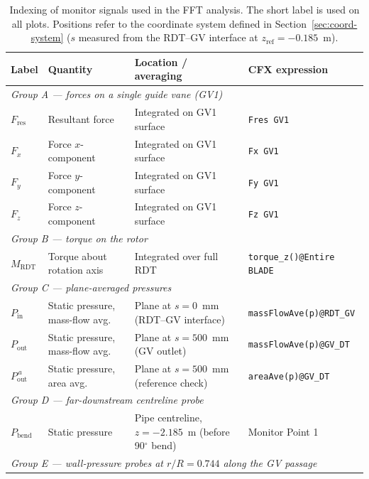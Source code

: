\begin{table}[H]
\centering
\small
\caption{Indexing of monitor signals used in the FFT analysis. The
short label is used on all plots. Positions refer to the coordinate
system defined in Section~\ref{sec:coord-system} ($s$ measured from
the \ac{RDT}--\ac{GV} interface at $z_{\mathrm{ref}} = -0.185$~m).}
\label{tab:monitor-index}
\begin{tabular}{llll}
\hline
Label & Quantity & Location / averaging & CFX expression \\ \hline
\multicolumn{4}{l}{\textit{Group A — forces on a single guide vane (GV1)}} \\
$F_{\mathrm{res}}$ & Resultant force     & Integrated on GV1 surface & \verb|Fres GV1| \\
$F_x$              & Force $x$-component & Integrated on GV1 surface & \verb|Fx GV1|   \\
$F_y$              & Force $y$-component & Integrated on GV1 surface & \verb|Fy GV1|   \\
$F_z$              & Force $z$-component & Integrated on GV1 surface & \verb|Fz GV1|   \\[0.4em]
\multicolumn{4}{l}{\textit{Group B — torque on the rotor}} \\
$M_{\mathrm{RDT}}$ & Torque about rotation axis & Integrated over full RDT
                                                & \verb|torque_z()@Entire BLADE| \\[0.4em]
\multicolumn{4}{l}{\textit{Group C — plane-averaged pressures}} \\
$P_{\mathrm{in}}$  & Static pressure, mass-flow avg.
                   & Plane at $s = 0$~mm (RDT--GV interface)
                   & \verb|massFlowAve(p)@RDT_GV| \\
$P_{\mathrm{out}}$ & Static pressure, mass-flow avg.
                   & Plane at $s = 500$~mm (GV outlet)
                   & \verb|massFlowAve(p)@GV_DT| \\
$P_{\mathrm{out}}^{\,a}$ & Static pressure, area avg.
                   & Plane at $s = 500$~mm (reference check)
                   & \verb|areaAve(p)@GV_DT| \\[0.4em]
\multicolumn{4}{l}{\textit{Group D — far-downstream centreline probe}} \\
$P_{\mathrm{bend}}$ & Static pressure & Pipe centreline, $z = -2.185$~m
                                      (before 90$^\circ$ bend)
                   & Monitor Point 1 \\[0.4em]
\multicolumn{4}{l}{\textit{Group E — wall-pressure probes at $r/R = 0.744$ along the GV passage}} \\

\end{tabular}
\end{table}
